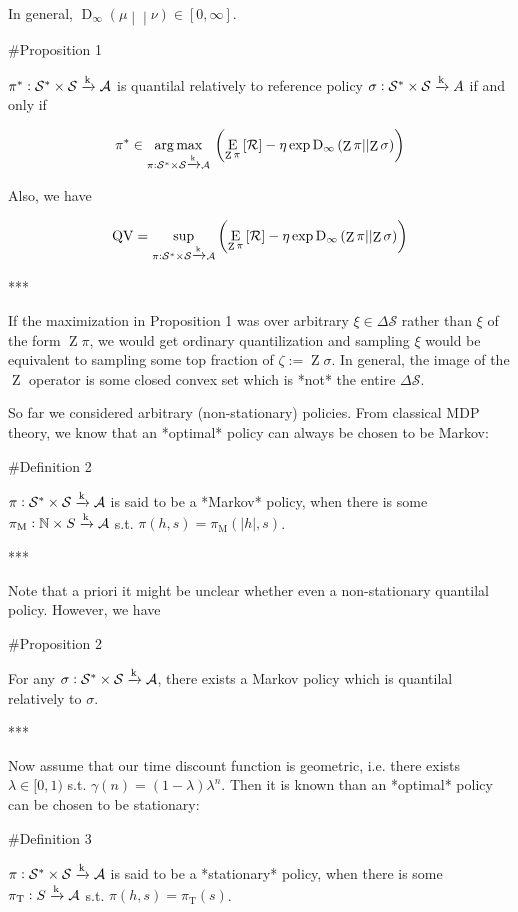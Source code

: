 \documentclass[a4paper]{article}
\newcommand{\Comment}[1]{}
\newcommand{\AP}[1]{\left(#1\right)}
\newcommand{\AB}[1]{\left[#1\right]}
\newcommand{\Ea}[2]{\underset{#1}{\operatorname{E}}\AB{#2}}
\newcommand{\RD}[3]{\operatorname{D}_{#1}\AP{#2\middle\vert\middle\vert#3}}
\newcommand{\Argmax}[1]{\underset{#1}{\operatorname{arg\,max}}\,}
\newcommand{\Nats}{\mathbb{N}}
\newcommand{\Abs}[1]{\left\vert #1 \right\vert}
\newcommand{\K}{\xrightarrow{\textnormal{k}}}
\newcommand{\A}{\mathcal{A}}
\newcommand{\St}{\mathcal{S}}
\newcommand{\R}{\mathcal{R}}
\newcommand{\QV}{\operatorname{QV}}
\DeclareMathOperator{\Z}{Z}
\begin{document}
In general, $\RD{\infty}{\mu}{\nu} \in [0,\infty]$. 

\#Proposition 1

$\pi^* : \St^*\times\St \K \A$ is quantilal relatively to reference policy $\sigma: \St^*\times\St \K A$ if and only if

$$\pi^* \in \Argmax{\pi: \St^*\times\St \K \A}\AP{\Ea{\Z{\pi}}{\R}-\eta \exp{\RD{\infty}{\Z{\pi}}{\Z{\sigma}}}}$$

Also, we have

$$\QV = \sup_{\pi: \St^*\times\St \K \A}\AP{\Ea{\Z{\pi}}{\R}-\eta \exp{\RD{\infty}{\Z{\pi}}{\Z{\sigma}}}}$$

***

If the maximization in Proposition 1 was over arbitrary $\xi \in \Delta\St$ rather than $\xi$ of the form $\Z{\pi}$, we would get ordinary quantilization and sampling $\xi$ would be equivalent to sampling some top fraction of $\zeta:=\Z{\sigma}$. In general, the image of the $\Z$ operator is some closed convex set which is *not* the entire $\Delta\St$.  \Comment{Also, Proposition 1 shows that quantilality only depends on $\sigma$ via $\zeta$. In the following, we will say that $\pi$ is quantilal relatively to $\zeta\in\Delta\St$ when it satisfies the property given in Proposition 1 with $\Z{\sigma}$ replaced by $\zeta$.}

So far we considered arbitrary (non-stationary) policies. From classical MDP theory, we know that an *optimal* policy can always be chosen to be Markov:

\#Definition 2

$\pi: \St^* \times \St \K \A$ is said to be a *Markov* policy, when there is some $\pi_\text{M}: \Nats \times S \K \A$ s.t. $\pi(h,s)=\pi_\text{M}\AP{\Abs{h},s}$.

***

Note that a priori it might be unclear whether even a non-stationary quantilal policy. However, we have

\#Proposition 2

For any $\sigma: \St^* \times \St \K \A$, there exists a Markov policy which is quantilal relatively to $\sigma$.

***

Now assume that our time discount function is geometric, i.e. there exists $\lambda\in[0,1)$ s.t. $\gamma(n)=(1-\lambda)\lambda^n$. Then it is known than an *optimal* policy can be chosen to be stationary:

\#Definition 3

$\pi: \St^* \times \St \K \A$ is said to be a *stationary* policy, when there is some $\pi_\text{T}: S \K \A$ s.t. $\pi(h,s)=\pi_\text{T}\AP{s}$.
\end{document}
